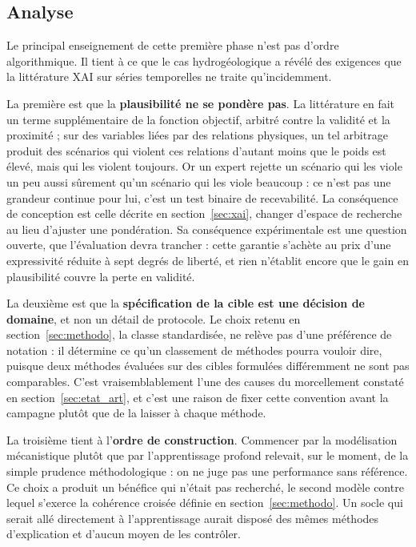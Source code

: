 \subsection{Analyse}

Le principal enseignement de cette première phase n'est pas d'ordre algorithmique. Il tient à ce que le cas hydrogéologique a révélé des exigences que la littérature XAI sur séries temporelles ne traite qu'incidemment.

La première est que la \textbf{plausibilité ne se pondère pas}. La littérature en fait un terme supplémentaire de la fonction objectif, arbitré contre la validité et la proximité ; sur des variables liées par des relations physiques, un tel arbitrage produit des scénarios qui violent ces relations d'autant moins que le poids est élevé, mais qui les violent toujours. Or un expert rejette un scénario qui les viole un peu aussi sûrement qu'un scénario qui les viole beaucoup : ce n'est pas une grandeur continue pour lui, c'est un test binaire de recevabilité. La conséquence de conception est celle décrite en section~\ref{sec:xai}, changer d'espace de recherche au lieu d'ajuster une pondération. Sa conséquence expérimentale est une question ouverte, que l'évaluation devra trancher : cette garantie s'achète au prix d'une expressivité réduite à sept degrés de liberté, et rien n'établit encore que le gain en plausibilité couvre la perte en validité.

La deuxième est que la \textbf{spécification de la cible est une décision de domaine}, et non un détail de protocole. Le choix retenu en section~\ref{sec:methodo}, la classe standardisée, ne relève pas d'une préférence de notation : il détermine ce qu'un classement de méthodes pourra vouloir dire, puisque deux méthodes évaluées sur des cibles formulées différemment ne sont pas comparables. C'est vraisemblablement l'une des causes du morcellement constaté en section~\ref{sec:etat_art}, et c'est une raison de fixer cette convention avant la campagne plutôt que de la laisser à chaque méthode.

La troisième tient à l'\textbf{ordre de construction}. Commencer par la modélisation mécanistique plutôt que par l'apprentissage profond relevait, sur le moment, de la simple prudence méthodologique : on ne juge pas une performance sans référence. Ce choix a produit un bénéfice qui n'était pas recherché, le second modèle contre lequel s'exerce la cohérence croisée définie en section~\ref{sec:methodo}. Un socle qui serait allé directement à l'apprentissage aurait disposé des mêmes méthodes d'explication et d'aucun moyen de les contrôler.
